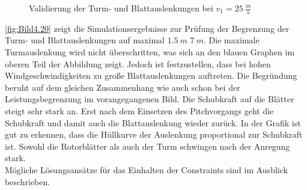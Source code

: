 \begin{figure}[H]
   \centering
   \caption[Constraint Turm- und Blattauslenkung]{Validierung der Turm- und Blattauslenkungen bei $v_1 = \SI{25}{\frac{m}{s}}$}
   \label{fig:Bild4.20}
\end{figure}

\autoref{fig:Bild4.20} zeigt die Simulationsergebnisse zur Prüfung der Begrenzung der Turm- und Blattauslenkungen auf maximal $\SI{1.5}{m}$ \bzw $\SI{7}{m}$. Die maximale Turmauslenkung wird nicht überschritten, was sich an den blauen Graphen im oberen Teil der Abbildung zeigt. Jedoch ist festzustellen, dass bei hohen Windgeschwindigkeiten zu große Blattauslenkungen auftreten. Die Begründung beruht auf dem gleichen Zusammenhang wie auch schon bei der Leistungsbegrenzung im vorangegangenen Bild. Die Schubkraft auf die Blätter steigt sehr stark an. Erst nach dem Einsetzen des Pitchvorgangs geht die Schubkraft und damit auch die Blattauslenkung wieder zurück. In der Grafik ist gut zu erkennen, dass die Hüllkurve der Auslenkung proportional zur Schubkraft ist. Sowohl die Rotorblätter als auch der Turm schwingen nach der Anregung stark.\\

Mögliche Lösungsansätze für das Einhalten der Constraints sind im Ausblick beschrieben.